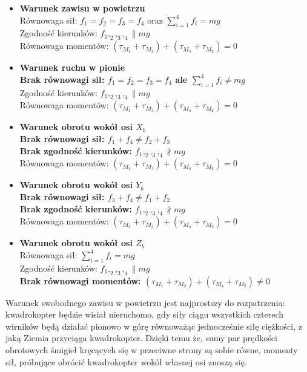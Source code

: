 \begin{itemize}
	\item \textbf{Warunek zawisu w powietrzu}\\ Równowaga sił: $f_1 = f_2 = f_3 = f_4$ oraz $\sum_{i=1}^{4} f_i = mg$ \\ Zgodność kierunków: $f_1,_2,_3,_4 \parallel mg$ \\Równowaga momentów: $(\tau_{M_1} + \tau_{M_3}) + (\tau_{M_4} + \tau_{M_2}) = 0$ 
	\item \textbf{Warunek ruchu w pionie} \\ \textbf{Brak równowagi sił: $f_1 = f_2 = f_3 = f_4$ ale  $\sum_{i=1}^{4} f_i \neq mg$} \\ Zgodność kierunków: $f_1,_2,_3,_4 \parallel mg$ \\ Równowaga momentów: $(\tau_{M_1} + \tau_{M_3}) + (\tau_{M_4} + \tau_{M_2}) = 0$  
	\item \textbf{Warunek obrotu wokół osi $X_b$} \\ \textbf{Brak równowagi sił: $f_1 + f_4 \neq f_2 + f_3 $} \\ \textbf{Brak zgodność kierunków: $f_1,_2,_3,_4 \not\parallel mg$} \\ Równowaga momentów: $(\tau_{M_1} + \tau_{M_3}) + (\tau_{M_4} + \tau_{M_2}) = 0$ \\ 
	\item \textbf{Warunek obrotu wokół osi $Y_b$} \\ \textbf{Brak równowagi sił: $f_3 + f_4 \neq f_1 + f_2$} \\ \textbf{Brak zgodność kierunków: $f_1,_2,_3,_4 \not\parallel mg$} \\ Równowaga momentów: $(\tau_{M_1} + \tau_{M_3}) + (\tau_{M_4} + \tau_{M_2}) = 0$ \\
	\item \textbf{Warunek obrotu wokół osi $Z_b$} \\ Równowaga sił: $\sum_{i=1}^{4} f_i = mg$ \\ Zgodność kierunków: $f_1,_2,_3,_4 \parallel mg$ \\ \textbf{Brak równowagi momentów: $(\tau_{M_1} + \tau_{M_3}) + (\tau_{M_4} + \tau_{M_2}) \neq 0 $}\\ 

\end{itemize}

Warunek swobodnego zawisu w powietrzu jest najprostszy do rozpatrzenia: kwadrokopter będzie wisiał nieruchomo, gdy siły ciągu wszystkich czterech wirników będą działać pionowo w górę równoważąc jednocześnie siłę ciężkości, z jaką Ziemia przyciąga kwadrokopter. Dzięki temu że, sumy par prędkości obrotowych śmigieł kręcących się w przeciwne strony są sobie równe, momenty sił, próbujące obrócić kwadrokopter wokół własnej osi znoszą się.

